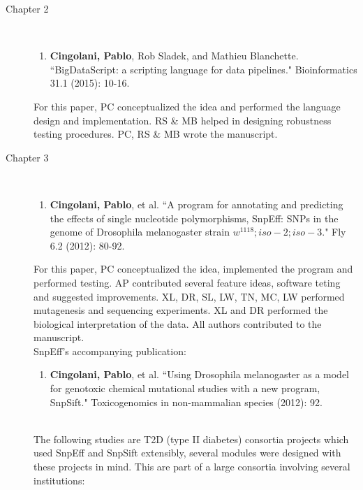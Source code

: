 \begin{description}
	
	\item[Chapter 2] ~ 
	
		\begin{enumerate}
			\item \textbf{Cingolani, Pablo}, Rob Sladek, and Mathieu Blanchette. ``BigDataScript: a scripting language for data pipelines." Bioinformatics 31.1 (2015): 10-16.
		\end{enumerate}

		For this paper, PC conceptualized the idea and performed the language design and implementation. RS \& MB helped in designing robustness testing procedures. PC, RS \& MB wrote the manuscript.
		\\
	
	\item[Chapter 3] ~
	
		\begin{enumerate}[resume]
			\item \textbf{Cingolani, Pablo}, et al. ``A program for annotating and predicting the effects of single nucleotide polymorphisms, SnpEff: SNPs in the genome of Drosophila melanogaster strain $w^{1118}; iso-2; iso-3$." Fly 6.2 (2012): 80-92.
		\end{enumerate}

		For this paper, PC conceptualized the idea, implemented the program and performed testing.
		AP contributed several feature ideas, software teting and suggested improvements.
		XL, DR, SL, LW, TN, MC, LW performed mutagenesis and sequencing experiments.
		XL and DR performed the biological interpretation of the data.
		All authors contributed to the manuscript.
		\\

		SnpEff's accompanying publication:
	
		\begin{enumerate}[resume]
			\item \textbf{Cingolani, Pablo}, et al. ``Using Drosophila melanogaster as a model for genotoxic chemical mutational studies with a new program, SnpSift." Toxicogenomics in non-mammalian species (2012): 92.
		\end{enumerate}
		
		~ \\

		The following studies are T2D (type II diabetes) consortia projects which used SnpEff and SnpSift extensibly, several modules were designed with these projects in mind. This are part of a large consortia involving several institutions:
	

\end{description}
